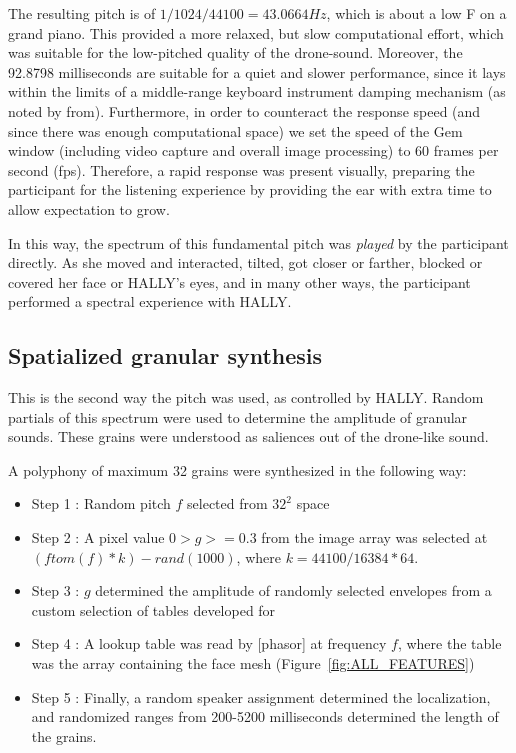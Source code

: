 \documentclass{nime-alternate}
\begin{document}
The resulting pitch is of \(1/1024/44100 = 43.0664 Hz\), which is about a low F on a grand piano. This provided a more relaxed, but slow computational effort, which was suitable for the low-pitched quality of the drone-sound. Moreover, the 92.8798 milliseconds are suitable for a quiet and slower performance, since it lays within the limits of a middle-range keyboard instrument damping mechanism (as noted by \cite{oliver:drum} from\cite{askenfelt:threshold}). Furthermore, in order to counteract the response speed (and since there was enough computational space) we set the speed of the Gem window (including video capture and overall image processing) to 60 frames per second (fps). Therefore, a rapid response was present visually, preparing the participant for the listening experience by providing the ear with extra time to allow expectation to grow.

In this way, the spectrum of this fundamental pitch was \textit{played} by the participant directly. As she moved and interacted, tilted, got closer or farther, blocked or covered her face or HALLY's eyes, and in many other ways, the participant performed a spectral experience with HALLY.

\subsection{Spatialized granular synthesis} 
This is the second way the pitch was used, as controlled by HALLY. Random partials of this spectrum were used to determine the amplitude of granular sounds. These grains were understood as saliences out of the drone-like sound. 

A polyphony of maximum 32 grains were synthesized in the following way: 
\begin{itemize}
\item Step 1 : Random pitch \(f\) selected from \(32^2\) space
\item Step 2 : A pixel value \(0 > g >= 0.3\) from the image array was selected at \((ftom(f)*k) - rand(1000)\),   where \(k = 44100/16384 * 64\).  
\item Step 3 : \(g\) determined the amplitude of randomly selected envelopes from a custom selection of tables developed for \cite{camara:fdlib}
\item Step 4 : A lookup table was read by [phasor\ttt] at frequency \(f\), where the table was the array containing the face mesh (Figure~\ref{fig:ALL_FEATURES})
\item Step 5 : Finally, a random speaker assignment determined the localization, and randomized ranges from 200-5200 milliseconds determined the length of the grains.
\end{itemize}
\end{document}
